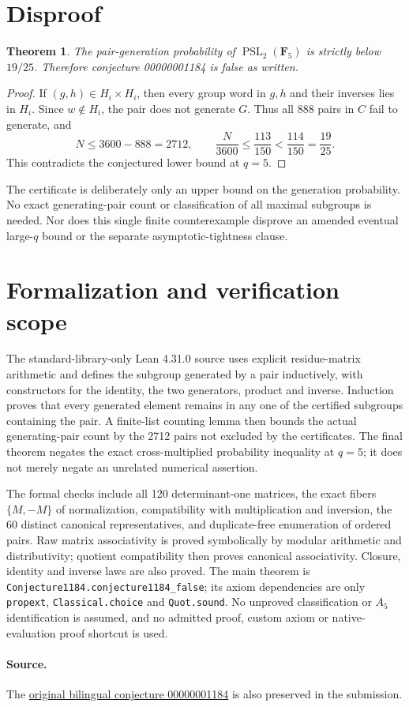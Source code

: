 \documentclass[10pt]{article}
\newtheorem{theorem}{Theorem}
\begin{document}
\section{Disproof}
\begin{theorem}
The pair-generation probability of $\operatorname{PSL}_2(\mathbf F_5)$ is strictly below $19/25$. Therefore conjecture 00000001184 is false as written.
\end{theorem}
\begin{proof}
If $(g,h)\in H_i\times H_i$, then every group word in $g,h$ and their inverses lies in $H_i$. Since $w\notin H_i$, the pair does not generate $G$. Thus all 888 pairs in $C$ fail to generate, and
\[
N\le3600-888=2712,
\qquad
\frac{N}{3600}\le\frac{113}{150}<\frac{114}{150}=\frac{19}{25}.
\]
This contradicts the conjectured lower bound at $q=5$.
\end{proof}
The certificate is deliberately only an upper bound on the generation probability. No exact generating-pair count or classification of all maximal subgroups is needed. Nor does this single finite counterexample disprove an amended eventual large-$q$ bound or the separate asymptotic-tightness clause.
\section{Formalization and verification scope}
The standard-library-only Lean 4.31.0 source uses explicit residue-matrix arithmetic and defines the subgroup generated by a pair inductively, with constructors for the identity, the two generators, product and inverse. Induction proves that every generated element remains in any one of the certified subgroups containing the pair. A finite-list counting lemma then bounds the actual generating-pair count by the 2712 pairs not excluded by the certificates. The final theorem negates the exact cross-multiplied probability inequality at $q=5$; it does not merely negate an unrelated numerical assertion.

The formal checks include all 120 determinant-one matrices, the exact fibers $\{M,-M\}$ of normalization, compatibility with multiplication and inversion, the 60 distinct canonical representatives, and duplicate-free enumeration of ordered pairs. Raw matrix associativity is proved symbolically by modular arithmetic and distributivity; quotient compatibility then proves canonical associativity. Closure, identity and inverse laws are also proved. The main theorem is \texttt{Conjecture1184.conjecture1184\_false}; its axiom dependencies are only \texttt{propext}, \texttt{Classical.choice} and \texttt{Quot.sound}. No unproved classification or $A_5$ identification is assumed, and no admitted proof, custom axiom or native-evaluation proof shortcut is used.
\paragraph{Source.} The \href{https://github.com/The-Last-Math-Competition/The-Last-Math-Competition/blob/main/conjectures/00000001184.md}{original bilingual conjecture 00000001184} is also preserved in the submission.
\end{document}
